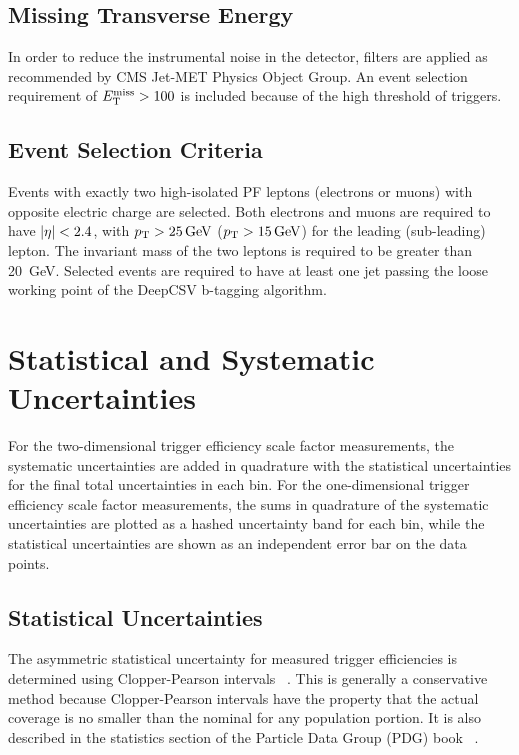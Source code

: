 \subsection{Missing Transverse Energy}
In order to reduce the instrumental noise in the detector, \MET filters are applied as recommended by CMS Jet-MET Physics Object Group.
An event selection requirement of $E_{\mathrm{T}}^{\text{miss}} > 100$ is included because of the high threshold of \MET triggers.
\subsection{Event Selection Criteria}
Events with exactly two high-\pT isolated PF leptons (electrons or muons) with opposite electric charge are selected. 
Both electrons and muons are required to have $\left\vert\eta\right\vert < 2.4$, with $\pT > \SI{25}{\GeV}$ ($\pT > \SI{15}{\GeV}$) for the leading (sub-leading) lepton.  
The invariant mass of the two leptons is required to be greater than \SI{20}{\GeV}.  
Selected events are required to have at least one jet passing the loose working point of the DeepCSV b-tagging algorithm.

\section{Statistical and Systematic Uncertainties}
For the two-dimensional trigger efficiency scale factor measurements, the systematic uncertainties are added in quadrature with the statistical uncertainties for the final total uncertainties in each bin. 
For the one-dimensional trigger efficiency scale factor measurements, the sums in quadrature of the systematic uncertainties are plotted as a hashed uncertainty band for each bin, while the statistical uncertainties are shown as an independent error bar on the data points.

\subsection{Statistical Uncertainties}
The asymmetric statistical uncertainty for measured trigger efficiencies is determined using Clopper-Pearson intervals ~\cite{bib:Cousins:2009kz}.
This is generally a conservative method because Clopper-Pearson intervals have the property that the actual coverage is no smaller than the nominal for any population portion. 
It is also described in the statistics section of the Particle Data Group (PDG) book ~\cite{bib:PDG}.

